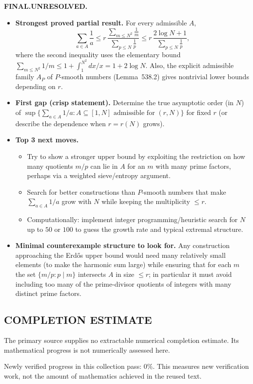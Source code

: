\noindent\textbf{FINAL.}\;\textbf{UNRESOLVED.}
\begin{itemize}
\item[(i)] \textbf{Strongest proved partial result.} For every admissible $A$,
\[
\sum_{a\in A}\frac{1}{a}\le r\,\frac{\sum_{m\le N^2} \frac{1}{m}}{\sum_{p\le N}\frac{1}{p}}
\le r\,\frac{2\log N+1}{\sum_{p\le N}\frac{1}{p}},
\]
where the second inequality uses the elementary bound $\sum_{m\le N^2}1/m\le 1+\int_1^{N^2} dx/x = 1+2\log N$.
Also, the explicit admissible family $A_P$ of $P$-smooth numbers (Lemma~538.2) gives nontrivial lower bounds depending on $r$.
\item[(ii)] \textbf{First gap (crisp statement).} Determine the true asymptotic order (in $N$) of
\(\sup\{\sum_{a\in A} 1/a : A\subseteq[1,N]\text{ admissible for }(r,N)\}\)
for fixed $r$ (or describe the dependence when $r=r(N)$ grows).
\item[(iii)] \textbf{Top 3 next moves.}
  \begin{itemize}
  \item Try to show a stronger upper bound by exploiting the restriction on how many quotients $m/p$ can lie in $A$ for an $m$ with many prime factors, perhaps via a weighted sieve/entropy argument.
  \item Search for better constructions than $P$-smooth numbers that make $\sum_{a\in A}1/a$ grow with $N$ while keeping the multiplicity $\le r$.
  \item Computationally: implement integer programming/heuristic search for $N$ up to $50$ or $100$ to guess the growth rate and typical extremal structure.
  \end{itemize}
\item[(iv)] \textbf{Minimal counterexample structure to look for.} Any construction approaching the Erd\H{o}s upper bound would need many relatively small elements (to make the harmonic sum large) while ensuring that for each $m$ the set $\{m/p: p\mid m\}$ intersects $A$ in size $\le r$; in particular it must avoid including too many of the prime-divisor quotients of integers with many distinct prime factors.
\end{itemize}




\subsection*{COMPLETION ESTIMATE}
The primary source supplies no extractable numerical completion estimate. Its mathematical progress is not numerically assessed here.

Newly verified progress in this collection pass: $0\%$. This measures new verification work, not the amount of mathematics achieved in the reused text.
